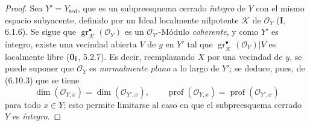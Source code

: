 \begin{proof}
Sea $Y'=Y_{\mathrm{red}}$, que es un subpreesquema cerrado \emph{íntegro} de $Y$
con el mismo espacio subyacente, definido por un Ideal localmente nilpotente
$\mathcal K$ de $\mathcal O_Y$ (\textbf I, 6.1.6). Se sigue que
$\operatorname{gr}_{\mathcal K}^{\bullet}(\mathcal O_Y)$ es un
$\mathcal O_{Y'}$-Módulo \emph{coherente}, y como $Y'$ es íntegro, existe una
vecindad abierta $V$ de $y$ en $Y'$ tal que
$\operatorname{gr}_{\mathcal K}^{\bullet}(\mathcal O_Y)|V$ es localmente
libre (\textbf{0}$_{\rm I}$, 5.2.7). Es decir, reemplazando $X$ por una
vecindad de $y$, se puede suponer que $\mathcal O_Y$ es \emph{normalmente plano}
a lo largo de $Y'$; se deduce, pues, de (6.10.3) que se tiene
\[
\dim(\mathcal O_{Y,x})=\dim(\mathcal O_{Y',x}),\qquad
\operatorname{prof}(\mathcal O_{Y,x})=
\operatorname{prof}(\mathcal O_{Y',x})
\]
para todo $x\in Y$; esto permite limitarse al caso en que el subpreesquema
cerrado $Y$ es \emph{íntegro}.


\end{proof}
